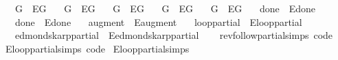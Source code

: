 \begin{isabellebody}
\ \ \ G{}{\isacharunderscore}{\kern0pt}{}\ {\isacharequal}{\kern0pt}\ E{\isachardot}{\kern0pt}G{}{\isacharunderscore}{\kern0pt}{}\isanewline
\ \ \ G{}{\isacharunderscore}{\kern0pt}{}\ {\isacharequal}{\kern0pt}\ E{\isachardot}{\kern0pt}G{}{\isacharunderscore}{\kern0pt}{}\isanewline
\ \ \ G{}{\isacharunderscore}{\kern0pt}{}\ {\isacharequal}{\kern0pt}\ E{\isachardot}{\kern0pt}G{}{\isacharunderscore}{\kern0pt}{}\isanewline
\ \ \ G{}\ {\isacharequal}{\kern0pt}\ E{\isachardot}{\kern0pt}G{}\isanewline
\ \ \ G{}\ {\isacharequal}{\kern0pt}\ E{\isachardot}{\kern0pt}G{}\isanewline
\ \ \ done{\isacharunderscore}{\kern0pt}{}\ {\isacharequal}{\kern0pt}\ E{\isachardot}{\kern0pt}done{\isacharunderscore}{\kern0pt}{}\isanewline
\ \ \ done{\isacharunderscore}{\kern0pt}{}\ {\isacharequal}{\kern0pt}\ E{\isachardot}{\kern0pt}done{\isacharunderscore}{\kern0pt}{}\isanewline
\ \ \ augment\ {\isacharequal}{\kern0pt}\ E{\isachardot}{\kern0pt}augment\isanewline
\ \ \ loop{\isacharprime}{\kern0pt}{\isacharunderscore}{\kern0pt}partial\ {\isacharequal}{\kern0pt}\ E{\isachardot}{\kern0pt}loop{\isacharprime}{\kern0pt}{\isacharunderscore}{\kern0pt}partial\isanewline
\ \ \ edmonds{\isacharunderscore}{\kern0pt}karp{\isacharunderscore}{\kern0pt}partial\ {\isacharequal}{\kern0pt}\ E{\isachardot}{\kern0pt}edmonds{\isacharunderscore}{\kern0pt}karp{\isacharunderscore}{\kern0pt}partial\isanewline
%
\isadelimproof
\ \ %
\endisadelimproof
%
\isatagproof
\isacommand{{\isachardot}{\kern0pt}{\isachardot}{\kern0pt}}\isamarkupfalse%
%
\endisatagproof
{\isafoldproof}%
%
\isadelimproof
\isanewline
%
\endisadelimproof
\isanewline
{}\isamarkupfalse%
\ rev{\isacharunderscore}{\kern0pt}follow{\isacharunderscore}{\kern0pt}partial{\isachardot}{\kern0pt}simps\ {\isacharbrackleft}{\kern0pt}code{\isacharbrackright}{\kern0pt}\isanewline
{}\isamarkupfalse%
\ E{\isachardot}{\kern0pt}loop{\isacharprime}{\kern0pt}{\isacharunderscore}{\kern0pt}partial{\isachardot}{\kern0pt}simps\ {\isacharbrackleft}{\kern0pt}code{\isacharbrackright}{\kern0pt}\isanewline
%
\isadeliminvisible
%
\endisadeliminvisible
%
\isataginvisible
{}\isamarkupfalse%
\ E{\isachardot}{\kern0pt}loop{\isacharprime}{\kern0pt}{\isacharunderscore}{\kern0pt}partial{\isachardot}{\kern0pt}simps\isanewline

\end{isabellebody}
